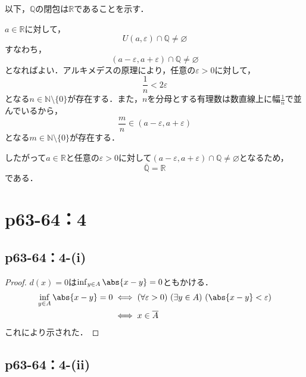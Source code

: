 \documentclass[a4paper,10pt,fleqn]{ltjsarticle}
\begin{document}
\begin{tleftbar}
    以下，$\mathbb{Q}$の閉包は$\mathbb{R}$であることを示す．

    $a \in \mathbb{R}$に対して，
    \[
    U(a,\varepsilon) \cap \mathbb{Q} \ne \varnothing
    \]
    すなわち，
    \[
        (a-\varepsilon,a+\varepsilon) \cap \mathbb{Q} \ne \varnothing
    \]
    となればよい．アルキメデスの原理により，任意の$\varepsilon >0$に対して，
    \[
        \frac{1}{n}< 2\varepsilon 
    \]
    となる$n \in \mathbb{N} \setminus \{0\}$が存在する．また，$n$を分母とする有理数は数直線上に幅$\frac{1}{n}$で並んでいるから，
    \[
        \frac{m}{n} \in (a-\varepsilon,a+\varepsilon)
    \]
    となる$ m \in \mathbb{N} \setminus \{0\}$が存在する．\par 
    したがって$a \in \mathbb{R}$と任意の$\varepsilon>0$に対して$(a-\varepsilon,a+\varepsilon) \cap \mathbb{Q} \ne \varnothing$となるため，
    \[
        \overline{\mathbb{Q}}=\mathbb{R}
    \]
    である．
\end{tleftbar}


\section*{p63-64：4}


\subsection*{p63-64：4-(i)}

\begin{tleftbar}
    \begin{proof}
            $d(x)=0$は$\inf_{y \in A} \abs{x-y} =0$ともかける．
            \begin{align*}
                \inf_{y \in A} \abs{x-y} =0 & \iff (\forall \varepsilon>0) \ (\exists y \in A)\ ( \abs{x-y}<\varepsilon ) \\
                & \iff x \in \overline{A}
            \end{align*}
            これにより示された．
        \end{proof}
    \end{tleftbar}


 \subsection*{p63-64：4-(ii)}
    
\end{document}
